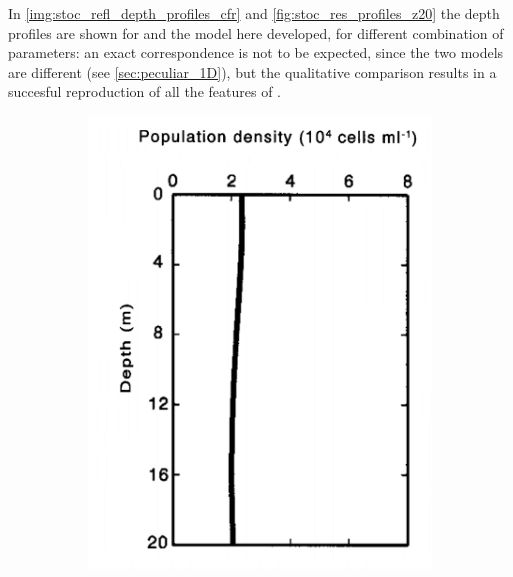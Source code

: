 In \autoref{img:stoc_refl_depth_profiles_cfr} and \autoref{fig:stoc_res_profiles_z20} the depth profiles are shown for \autocite{Huisman2002HowPersist} and the model here developed, for different combination of parameters: an exact correspondence is not to be expected, since the two models are different (see \autoref{sec:peculiar_1D}), but the qualitative comparison results in a succesful reproduction of all the features of \autocite{Huisman2002HowPersist}.

\begin{figure} 
    \centering
    \begin{subfigure}[b]{0.3\textwidth}
        \includegraphics[width=\textwidth]{img/H_dep_prof_d-1}
        \caption{}
        \label{fig:huism_prof_d-1}
    \end{subfigure}
    \begin{subfigure}[b]{0.3\textwidth}

\end{subfigure}
\end{figure}
